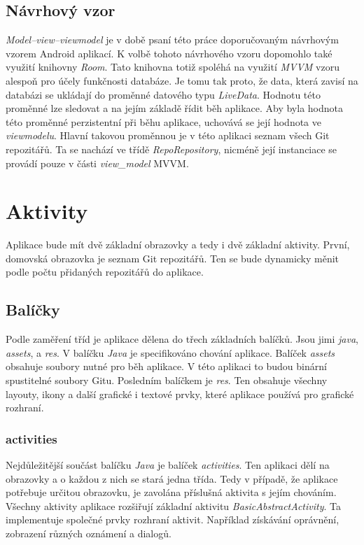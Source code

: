         \subsection{Návrhový vzor}
        \emph{Model–view–viewmodel} je v době psaní této práce doporučovaným návrhovým vzorem Android aplikací. K volbě tohoto návrhového vzoru dopomohlo také využití knihovny \emph{Room}. Tato knihovna totiž spoléhá na využití \emph{MVVM} vzoru alespoň pro účely funkčnosti databáze. Je tomu tak proto, že data, která zavisí na databázi se ukládají do proměnné datového typu \emph{LiveData}. Hodnotu této proměnné lze sledovat a na jejím základě řídit běh aplikace. Aby byla hodnota této proměnné perzistentní při běhu aplikace, uchovává se její hodnota ve \emph{viewmodelu}. Hlavní takovou proměnnou je v této aplikaci seznam všech Git repozitářů. Ta se nachází ve třídě \emph{RepoRepository}, nicméně její instanciace se provádí pouze v části \emph{view\_model} MVVM.

    \section{Aktivity}
    Aplikace bude mít dvě základní obrazovky a tedy i dvě základní aktivity. První, domovská obrazovka je seznam Git repozitářů. Ten se bude dynamicky měnit podle počtu přidaných repozitářů do aplikace.

    \subsection{Balíčky}
    Podle zaměření tříd je aplikace dělena do třech základních balíčků. Jsou jimi \emph{java}, \emph{assets}, a \emph{res}. V balíčku \emph{Java} je specifikováno chování aplikace. Balíček \emph{assets} obsahuje soubory nutné pro běh aplikace. V této aplikaci to budou binární spustitelné soubory Gitu. Posledním balíčkem je \emph{res}. Ten obsahuje všechny layouty, ikony a další grafické i textové prvky, které aplikace používá pro grafické rozhraní.

        \subsubsection{activities}
        Nejdůležitější součást balíčku \emph{Java} je balíček \emph{activities}. Ten aplikaci dělí na obrazovky a o každou z nich se stará jedna třída. Tedy v případě, že aplikace potřebuje určitou obrazovku, je zavolána příslušná aktivita s jejím chováním. Všechny aktivity aplikace rozšiřují základní aktivitu \emph{BasicAbstractActivity}. Ta implementuje společné prvky rozhraní aktivit. Například získávání oprávnění, zobrazení různých oznámení a dialogů.

